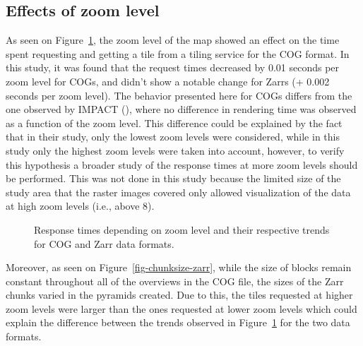 \documentclass[
  oneside,
  open=any]{scrbook}
\begin{document}
\subsection{Effects of zoom level}\label{effects-of-zoom-level}

As seen on Figure~\ref{fig-comp-zoom}, the zoom level of the map showed
an effect on the time spent requesting and getting a tile from a tiling
service for the COG format. In this study, it was found that the request
times decreased by 0.01 seconds per zoom level for COGs, and didn't show
a notable change for Zarrs (+ 0.002 seconds per zoom level). The
behavior presented here for COGs differs from the one observed by IMPACT
(), where no difference in
rendering time was observed as a function of the zoom level. This
difference could be explained by the fact that in their study, only the
lowest zoom levels were considered, while in this study only the highest
zoom levels were taken into account, however, to verify this hypothesis
a broader study of the response times at more zoom levels should be
performed. This was not done in this study because the limited size of
the study area that the raster images covered only allowed visualization
of the data at high zoom levels (i.e., above 8).

\begin{figure}[H]


\caption{\label{fig-comp-zoom}Response times depending on zoom level and
their respective trends for COG and Zarr data formats.}

\end{figure}%

Moreover, as seen on Figure~\ref{fig-chunksize-zarr}, while the size of
blocks remain constant throughout all of the overviews in the COG file,
the sizes of the Zarr chunks varied in the pyramids created. Due to
this, the tiles requested at higher zoom levels were larger than the
ones requested at lower zoom levels which could explain the difference
between the trends observed in Figure~\ref{fig-comp-zoom} for the two
data formats.
\end{document}
